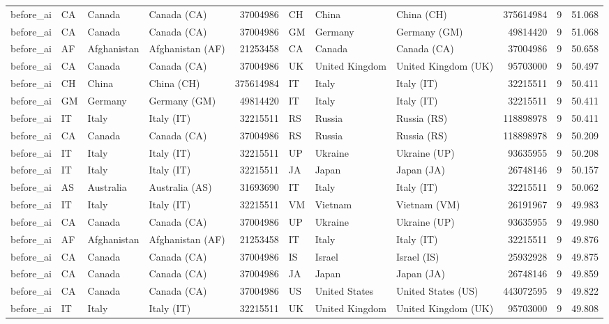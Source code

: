 \begin{tabular}{llllrlllrrr}
before\_ai & CA & Canada & Canada (CA) & 37004986 & CH & China & China (CH) & 375614984 & 9 & 51.068 \\
before\_ai & CA & Canada & Canada (CA) & 37004986 & GM & Germany & Germany (GM) & 49814420 & 9 & 51.068 \\
before\_ai & AF & Afghanistan & Afghanistan (AF) & 21253458 & CA & Canada & Canada (CA) & 37004986 & 9 & 50.658 \\
before\_ai & CA & Canada & Canada (CA) & 37004986 & UK & United Kingdom & United Kingdom (UK) & 95703000 & 9 & 50.497 \\
before\_ai & CH & China & China (CH) & 375614984 & IT & Italy & Italy (IT) & 32215511 & 9 & 50.411 \\
before\_ai & GM & Germany & Germany (GM) & 49814420 & IT & Italy & Italy (IT) & 32215511 & 9 & 50.411 \\
before\_ai & IT & Italy & Italy (IT) & 32215511 & RS & Russia & Russia (RS) & 118898978 & 9 & 50.411 \\
before\_ai & CA & Canada & Canada (CA) & 37004986 & RS & Russia & Russia (RS) & 118898978 & 9 & 50.209 \\
before\_ai & IT & Italy & Italy (IT) & 32215511 & UP & Ukraine & Ukraine (UP) & 93635955 & 9 & 50.208 \\
before\_ai & IT & Italy & Italy (IT) & 32215511 & JA & Japan & Japan (JA) & 26748146 & 9 & 50.157 \\
before\_ai & AS & Australia & Australia (AS) & 31693690 & IT & Italy & Italy (IT) & 32215511 & 9 & 50.062 \\
before\_ai & IT & Italy & Italy (IT) & 32215511 & VM & Vietnam & Vietnam (VM) & 26191967 & 9 & 49.983 \\
before\_ai & CA & Canada & Canada (CA) & 37004986 & UP & Ukraine & Ukraine (UP) & 93635955 & 9 & 49.980 \\
before\_ai & AF & Afghanistan & Afghanistan (AF) & 21253458 & IT & Italy & Italy (IT) & 32215511 & 9 & 49.876 \\
before\_ai & CA & Canada & Canada (CA) & 37004986 & IS & Israel & Israel (IS) & 25932928 & 9 & 49.875 \\
before\_ai & CA & Canada & Canada (CA) & 37004986 & JA & Japan & Japan (JA) & 26748146 & 9 & 49.859 \\
before\_ai & CA & Canada & Canada (CA) & 37004986 & US & United States & United States (US) & 443072595 & 9 & 49.822 \\
before\_ai & IT & Italy & Italy (IT) & 32215511 & UK & United Kingdom & United Kingdom (UK) & 95703000 & 9 & 49.808 \\

\end{tabular}
